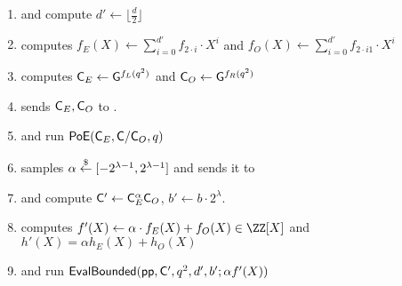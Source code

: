 \documentclass[12pt]{article}
\theoremstyle{Definition}
\begin{document}
\begin{mdframed}
\begin{minipage}{\textwidth}
\begin{enumerate}[nolistsep]
        \item \pcind[1] \prover and \verifier compute $d' \gets \lfloor\frac{d}{2}\rfloor$
        \item \pcind[1] \prover computes $f_E(X) \gets \sum\limits_{i=0}^{d'} f_{2\cdot i} \cdot X^i$ and $f_O(X)\gets\sum\limits_{i=0}^{d'} f_{2\cdot i 1}\cdot X^{i}$
        \item \pcind[1] \prover computes $\mathsf{C}_E \gets \mathsf{G}^{f_L(q^2)}$ and $\mathsf{C}_O \gets \mathsf{G}^{f_R(q^2)}$
        \item \pcind[1] \prover sends $\mathsf{C}_E, \mathsf{C}_O$ to \verifier. 
        \item \pcind[1] \label{line:PoE} \prover and \verifier run $\textsf{{PoE}}(\mathsf{C}_E, \mathsf{C}/\mathsf{C}_O, q)$
        \item \pcind[1] \verifier samples $\alpha \overset{\$}{\gets} [-2^{\lambda-1},2^{\lambda-1}]$ and sends it to \prover
        \item \pcind[1] \prover and \verifier compute $\mathsf{C}' \gets \mathsf{C}_E^\alpha  \mathsf{C}_O$, $b'\gets b \cdot 2^{\lambda}$. 
        \item \pcind[1] \prover computes $f'(X) \gets \alpha \cdot f_E(X) + f_O(X) \in \ZZ[X]$  and\\
        \pcind[1] $h'(X)=\alpha h_E(X) + h_O(X)$
        \item \pcind[1] \prover and \verifier run $\textsf{{EvalBounded}}(\textsf{pp}, \mathsf{C}',q^2, d',b' ; \alpha f'(X))$
               \end{enumerate}
      \end{minipage}
\end{mdframed}

 
 
\end{document}
